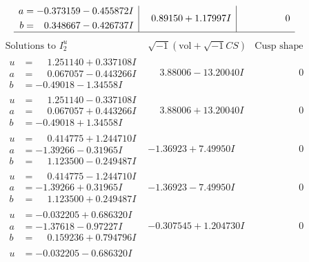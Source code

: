 \documentclass[1p]{elsarticle_modified}
\theoremstyle{definition}
\newcommand{\I}{\sqrt{-1}}
\begin{document}
$$\begin{array}{c|c|c}
\begin{aligned}
a &= -0.373159 - 0.455872 I \\
b &= \phantom{-}0.348667 - 0.426737 I\end{aligned}
 & \phantom{-}0.89150 + 1.17997 I & \phantom{-0.000000 } 0\\
 \hline 
 \end{array}$$\newpage$$\begin{array}{c|c|c}  
\text{Solutions to }I^u_{2}& \I (\text{vol} + \sqrt{-1}CS) & \text{Cusp shape}\\
 \hline 
\begin{aligned}
u &= \phantom{-}1.251140 + 0.337108 I \\
a &= \phantom{-}0.067057 - 0.443266 I \\
b &= -0.49018 - 1.34558 I\end{aligned}
 & \phantom{-}3.88006 - 13.20040 I & \phantom{-0.000000 } 0 \\ \hline\begin{aligned}
u &= \phantom{-}1.251140 - 0.337108 I \\
a &= \phantom{-}0.067057 + 0.443266 I \\
b &= -0.49018 + 1.34558 I\end{aligned}
 & \phantom{-}3.88006 + 13.20040 I & \phantom{-0.000000 } 0 \\ \hline\begin{aligned}
u &= \phantom{-}0.414775 + 1.244710 I \\
a &= -1.39266 - 0.31965 I \\
b &= \phantom{-}1.123500 - 0.249487 I\end{aligned}
 & -1.36923 + 7.49950 I & \phantom{-0.000000 } 0 \\ \hline\begin{aligned}
u &= \phantom{-}0.414775 - 1.244710 I \\
a &= -1.39266 + 0.31965 I \\
b &= \phantom{-}1.123500 + 0.249487 I\end{aligned}
 & -1.36923 - 7.49950 I & \phantom{-0.000000 } 0 \\ \hline\begin{aligned}
u &= -0.032205 + 0.686320 I \\
a &= -1.37618 - 0.97227 I \\
b &= \phantom{-}0.159236 + 0.794796 I\end{aligned}
 & -0.307545 + 1.204730 I & \phantom{-0.000000 } 0 \\ \hline\begin{aligned}
u &= -0.032205 - 0.686320 I \\

\end{aligned}
\end{array}$$
\end{document}
